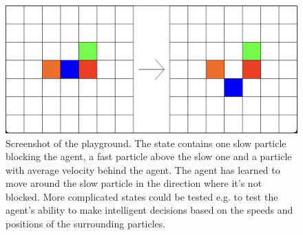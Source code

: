 \begin{figure}[h]
    \centering
    \includegraphics[width=\textwidth]{playground.png}
    \caption{Screenshot of the playground. The state contains one slow particle blocking the agent, a fast particle above the slow one and a particle with average velocity behind the agent. The agent has learned to move around the slow particle in the direction where it's not blocked. More complicated states could be tested e.g. to test the agent's ability to make intelligent decisions based on the speeds and positions of the surrounding particles.}
    \label{fig:playground}
\end{figure}


